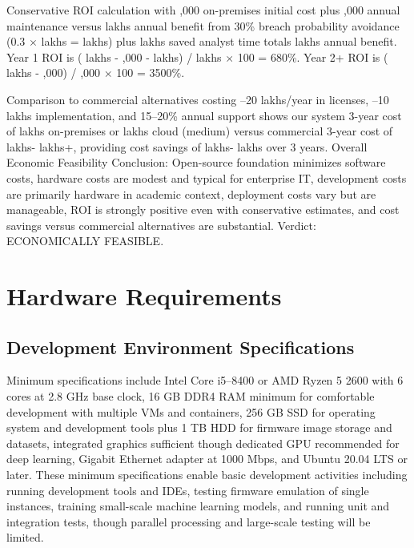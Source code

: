 Conservative ROI calculation with ,000 on-premises initial cost plus ,000 annual maintenance versus  lakhs annual benefit from 30\% breach probability avoidance (0.3 $\times$  lakhs =  lakhs) plus  lakhs saved analyst time totals  lakhs annual benefit. Year 1 ROI is ( lakhs - ,000 -  lakhs) /  lakhs $\times$ 100 = 680\%. Year 2+ ROI is ( lakhs - ,000) / ,000 $\times$ 100 = 3500\%.

Comparison to commercial alternatives costing --20 lakhs/year in licenses, --10 lakhs implementation, and 15--20\% annual support shows our system 3-year cost of  lakhs on-premises or  lakhs cloud (medium) versus commercial 3-year cost of  lakhs- lakhs+, providing cost savings of  lakhs- lakhs over 3 years. Overall Economic Feasibility Conclusion: Open-source foundation minimizes software costs, hardware costs are modest and typical for enterprise IT, development costs are primarily hardware in academic context, deployment costs vary but are manageable, ROI is strongly positive even with conservative estimates, and cost savings versus commercial alternatives are substantial. Verdict: ECONOMICALLY FEASIBLE.

\section{Hardware Requirements}

\subsection{Development Environment Specifications}

Minimum specifications include Intel Core i5--8400 or AMD Ryzen 5 2600 with 6 cores at 2.8 GHz base clock, 16 GB DDR4 RAM minimum for comfortable development with multiple VMs and containers, 256 GB SSD for operating system and development tools plus 1 TB HDD for firmware image storage and datasets, integrated graphics sufficient though dedicated GPU recommended for deep learning, Gigabit Ethernet adapter at 1000 Mbps, and Ubuntu 20.04 LTS or later. These minimum specifications enable basic development activities including running development tools and IDEs, testing firmware emulation of single instances, training small-scale machine learning models, and running unit and integration tests, though parallel processing and large-scale testing will be limited.

